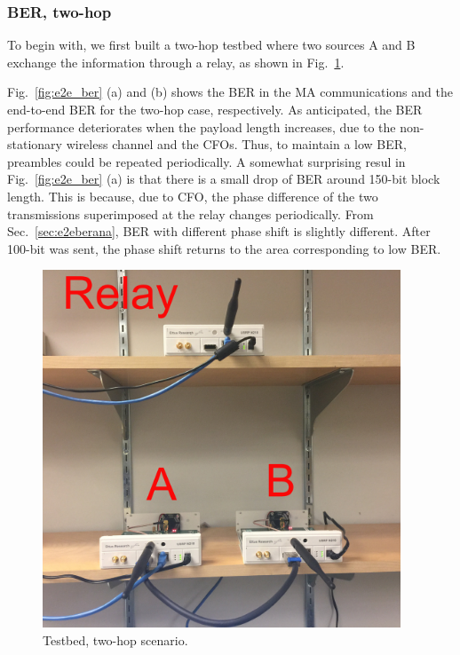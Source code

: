\subsubsection{BER, two-hop}
To begin with, we first built a two-hop testbed where two sources A and B exchange the information through a relay, as shown in Fig.~\ref{fig:twohoptestbed}. 

Fig.~\ref{fig:e2e_ber} (a) and (b) shows the BER in the MA communications and the end-to-end BER for the two-hop case, respectively. As anticipated, the BER performance deteriorates when the payload length increases, due to the non-stationary wireless channel and the CFOs. Thus, to maintain a low BER,  preambles could be repeated periodically.
A somewhat surprising resul in Fig.~\ref{fig:e2e_ber} (a) is that there is a small drop of BER around 150-bit block length. This is because, due to CFO, the phase difference of the two transmissions superimposed at the relay changes periodically. From  Sec.~\ref{sec:e2eberana}, BER with different phase shift is slightly different. After 100-bit was sent, the phase shift returns to the area corresponding to low BER.  %

\begin{figure}
    \centering
    \includegraphics[width=0.95\textwidth]{figures/testbed}
    \caption{Testbed, two-hop scenario.}\label{fig:twohoptestbed}
\end{figure}

